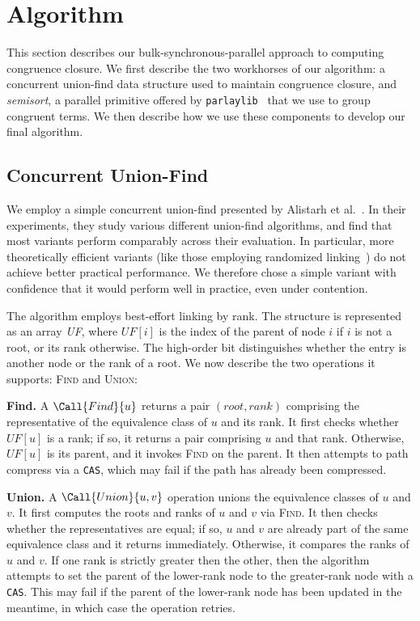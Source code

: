 \section{Algorithm}
\label{sec:alg}

This section describes our bulk-synchronous-parallel approach to computing
congruence closure. We first describe the two workhorses of our algorithm: a
concurrent union-find data structure used to maintain congruence closure, and
\textit{semisort}, a parallel primitive offered by
\texttt{parlaylib}~\cite{parlaylib} that we use to group congruent terms. We
then describe how we use these components to develop our final algorithm.

\subsection{Concurrent Union-Find}
\label{subsec:uf}

We employ a simple concurrent union-find presented by Alistarh et al.~\cite{uf}.
In their experiments, they study various different union-find algorithms, and
find that most variants perform comparably across their evaluation. In
particular, more theoretically efficient variants (like those employing
randomized linking~\cite{jayanti16}) do not achieve better practical
performance. We therefore chose a simple variant with confidence that it would
perform well in practice, even under contention.

The algorithm employs best-effort linking by rank. The structure is represented
as an array \textit{UF}, where $\mathit{UF}[i]$ is the index of the parent of
node $i$ if $i$ is not a root, or its rank otherwise. The high-order bit
distinguishes whether the entry is another node or the rank of a root. We now
describe the two operations it supports: \textsc{Find} and \textsc{Union}:

\textbf{Find.} A $\Call{Find}{u}$ returns a pair $(\mathit{root},
\mathit{rank})$ comprising the representative of the equivalence class of $u$
and its rank. It first checks whether $\mathit{UF}[u]$ is a rank; if so, it
returns a pair comprising $u$ and that rank. Otherwise, $\mathit{UF}[u]$ is its
parent, and it invokes \textsc{Find} on the parent. It then attempts to path
compress via a \texttt{CAS}, which may fail if the path has already been
compressed.

\textbf{Union.} A $\Call{Union}{u, v}$ operation unions the equivalence classes
of $u$ and $v$. It first computes the roots and ranks of $u$ and $v$ via
\textsc{Find}. It then checks whether the representatives are equal; if so, $u$
and $v$ are already part of the same equivalence class and it returns
immediately. Otherwise, it compares the ranks of $u$ and $v$. If one rank is
strictly greater then the other, then the algorithm attempts to set the parent
of the lower-rank node to the greater-rank node with a \texttt{CAS}. This may
fail if the parent of the lower-rank node has been updated in the meantime, in
which case the operation retries.

